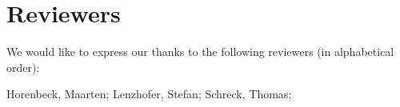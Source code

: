 \section{Reviewers}

We would like to express our thanks to the following reviewers (in alphabetical order):

Horenbeck, Maarten;
Lenzhofer, Stefan;
Schreck, Thomas; 


